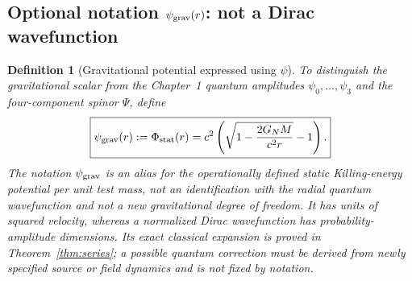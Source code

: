 \documentclass[11pt,a4paper]{article}
\newtheorem{definition}[theorem]{Definition}
\theoremstyle{remark}
\begin{document}
\subsection{Optional notation \texorpdfstring{$\psi_{\rm grav}(r)$}{psi grav(r)}: not a Dirac wavefunction}
\begin{definition}[Gravitational potential expressed using $\psi$]
To distinguish the gravitational scalar from the Chapter~1 quantum amplitudes
$\psi_0,\ldots,\psi_3$ and the four-component spinor $\Psi$, define
\begin{equation}\label{eq:psi-grav}
\boxed{\psi_{\rm grav}(r):=\Phi_{\rm stat}(r)
=c^2\left(\sqrt{1-\frac{2G_NM}{c^2r}}-1\right).}
\end{equation}
The notation $\psi_{\rm grav}$ is an \emph{alias} for the operationally defined
static Killing-energy potential per unit test mass, not an identification with
the radial quantum wavefunction and not a new gravitational degree of freedom.
It has units of squared velocity, whereas a normalized Dirac wavefunction has
probability-amplitude dimensions. Its exact classical expansion is proved in
Theorem~\ref{thm:series}; a possible quantum correction must be derived from
newly specified source or field dynamics and is not fixed by notation.
\end{definition}
\end{document}
